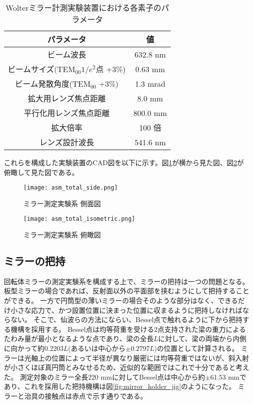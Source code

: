 \begin{table}[h]
\begin{center}
  \begin{tabular}{|c|c|} \hline
    パラメータ & 値 \\ \hline
    ビーム波長 & 632.8 nm  \\
    ビームサイズ($\text{TEM}_{00} 1/e^2$点 +3\%) & 0.63 mm  \\
    ビーム発散角度($\text{TEM}_{00}$ +3\%) & 1.3 mrad  \\
    拡大用レンズ焦点距離 & 8.0 mm  \\
    平行化用レンズ焦点距離 & 800.0 mm  \\
    拡大倍率 & 100 倍 \\
    レンズ設計波長 & 541.6 nm \\ \hline
  \end{tabular}
  \caption{Wolterミラー計測実験装置における各素子のパラメータ}
  \label{tb:mirror_experiment_params}
\end{center}
\end{table}

これらを構成した実験装置のCAD図を以下に示す。図\ref{fig:mirror_experiment_asm_cad_side}が横から見た図、図\ref{fig:mirror_experiment_asm_cad_isometric}が俯瞰して見た図である。

\begin{figure}[!ht]
\centering
\texttt{[image: asm\_total\_side.png]}
\caption{ミラー測定実験系 側面図}
\label{fig:mirror_experiment_asm_cad_side}
\end{figure}

\begin{figure}[!ht]
\centering
\texttt{[image: asm\_total\_isometric.png]}
\caption{ミラー測定実験系 俯瞰図}
\label{fig:mirror_experiment_asm_cad_isometric}
\end{figure}


\subsection{ミラーの把持}
回転体ミラーの測定実験系を構成する上で、ミラーの把持は一つの問題となる。
板型ミラーの場合であれば、反射面以外の平面部を挟むようにして把持することができる。
一方で円筒型の薄いミラーの場合そのような部分はなく、できるだけ小さな応力で、かつ設置位置に決まった位置に収まるように把持しなければならない。
そこで、仙波らの方法にならい、Bessel点で触れるように下から把持する機構を採用する。\cite{Senba2010}
Bessel点は均等荷重を受ける2点支持された梁の重力によるたわみ量が最小となるような点であり、梁の全長$L$に対して、梁の両端から内側に向かって約$0.2203L$(あるいは中心から$\pm 0.2797 L$)の位置として計算される。
ミラーは光軸上の位置によって半径が異なり厳密には均等荷重ではないが、斜入射が小さくほぼ真円筒とみなせるため、近似的な範囲ではこれで十分であると考えた。
測定対象のミラー全長220 mmに対してBessel点は中心から約$\pm$61.53 mmであり、これを採用した把持機構は図\ref{fig:mirror_holder_jig}のようになった。
ミラーと治具の接触点は赤点で示す通りである。

